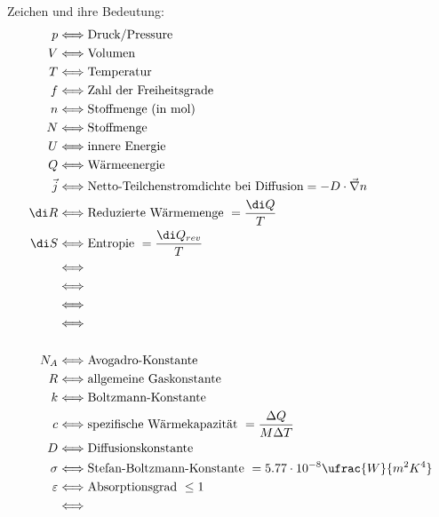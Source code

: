 \documentclass[11pt,letterpaper]{article}
\begin{document}
{{{    Zeichen und ihre Bedeutung:
    \begin{align*}
        p &\Longleftrightarrow \text{Druck/Pressure}\\
        V &\Longleftrightarrow \text{Volumen}\\
        T &\Longleftrightarrow \text{Temperatur}\\
        f &\Longleftrightarrow \text{Zahl der Freiheitsgrade}\\
        n &\Longleftrightarrow \text{Stoffmenge (in mol)}\\
        N &\Longleftrightarrow \text{Stoffmenge}\\
        U &\Longleftrightarrow \text{innere Energie}\\
        Q &\Longleftrightarrow \text{Wärmeenergie}\\
        \vec{j} &\Longleftrightarrow \text{Netto-Teilchenstromdichte bei Diffusion} = -D\cdot \vec{\nabla}n\\
        \di R &\Longleftrightarrow \text{Reduzierte Wärmemenge} \ = \frac{\di Q}{T}\\
        \di S &\Longleftrightarrow \text{Entropie} \ = \frac{\di Q_{rev}}{T}\\
        &\Longleftrightarrow \text{}\\
        &\Longleftrightarrow \text{}\\
        &\Longleftrightarrow \text{}\\
        &\Longleftrightarrow \text{}\\
        \\
        N_A &\Longleftrightarrow \text{Avogadro-Konstante}\\
        R &\Longleftrightarrow \text{allgemeine Gaskonstante}\\
        k &\Longleftrightarrow \text{Boltzmann-Konstante}\\
        c &\Longleftrightarrow \text{spezifische Wärmekapazität}\ = \frac{\Delta Q}{M\Delta T}\\
        D &\Longleftrightarrow \text{Diffusionskonstante}\\
        \sigma &\Longleftrightarrow \text{Stefan-Boltzmann-Konstante}\ = 5.77\cdot 10^{-8}\ufrac{W}{m^2K^4}\\
        \varepsilon &\Longleftrightarrow \text{Absorptionsgrad}\ \le 1\\
        &\Longleftrightarrow \text{}\\
    \end{align*}
 }
 }}
 
 
\end{document}
